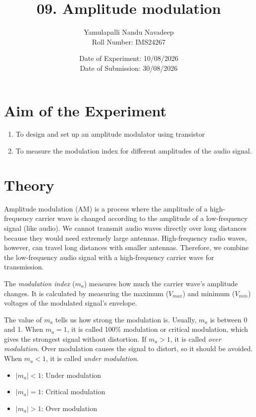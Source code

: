 \documentclass[12pt,a4paper]{article}
\title{\textbf{09. Amplitude modulation}}
\author{Yamulapalli Nandu Navadeep \\ Roll Number: IMS24267}
\date{Date of Experiment: 10/08/2026 \\ Date of Submission: 30/08/2026}
\begin{document}
\maketitle

\section{Aim of the Experiment}
\begin{enumerate}
    \item To design and set up an amplitude modulator using transistor
    \item To measure the modulation index for different amplitudes of the audio signal.
\end{enumerate}

\section{Theory}
Amplitude modulation (AM) is a process where the amplitude of a high-frequency carrier wave is changed according to the amplitude of a low-frequency signal (like audio). We cannot transmit audio waves directly over long distances because they would need extremely large antennas. High-frequency radio waves, however, can travel long distances with smaller antennas. Therefore, we combine the low-frequency audio signal with a high-frequency carrier wave for transmission.

The \textit{modulation index} ($m_a$) measures how much the carrier wave's amplitude changes. It is calculated by measuring the maximum ($V_{max}$) and minimum ($V_{min}$) voltages of the modulated signal's envelope.

The value of $m_a$ tells us how strong the modulation is. Usually, $m_a$ is between 0 and 1. When $m_a = 1$, it is called 100\% modulation or critical modulation, which gives the strongest signal without distortion. If $m_a > 1$, it is called \textit{over modulation}. Over modulation causes the signal to distort, so it should be avoided. When $m_a < 1$, it is called \textit{under modulation}.

\begin{itemize}
    \item $|m_a| < 1$: Under modulation
    \item $|m_a| = 1$: Critical modulation
    \item $|m_a| > 1$: Over modulation
\end{itemize}
\end{document}
